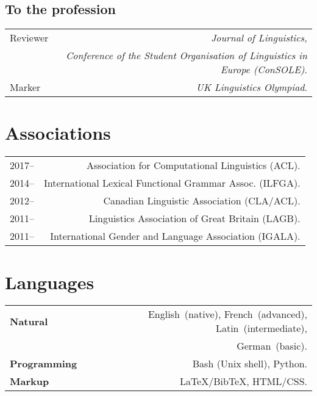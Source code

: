 \documentclass[11pt,a4paper,twoside]{article}
\makeatletter
\newenvironment{cvsection}{%
  \setlength{\extrarowheight}{0.70ex}
  \begin{longtable}[l]{@{} L R @{}}
}{%
  \end{longtable}
}
\makeatother
\begin{document}
\subsection*{To the profession}

\begin{cvsection}
Reviewer	&	\textit{Journal of Linguistics,}\\[-0.3em]
          & \textit{Conference of the Student Organisation of Linguistics in Europe (ConSOLE)}.\\
Marker    & \textit{UK Linguistics Olympiad}.
\end{cvsection}

\section*{Associations}

\begin{cvsection}
  2017--	& Association for Computational Linguistics (ACL).\\
  2014--  & International Lexical Functional Grammar Assoc. (ILFGA).\\
  2012-- 	& Canadian Linguistic Association (CLA\slash ACL).\\
  2011-- 	& Linguistics Association of Great Britain (LAGB).\\
  2011-- 	& International Gender and Language Association (IGALA).\\
\end{cvsection}

\section*{Languages}

\begin{cvsection}
  \textbf{Natural}      & English~(native), French~(advanced), Latin~(intermediate), \\[-0.3em] & German~(basic). \\
  \textbf{Programming}  & Bash (Unix shell), Python. \\
  \textbf{Markup}       & \LaTeX\slash Bib\TeX, HTML\slash CSS.
\end{cvsection}
\end{document}
